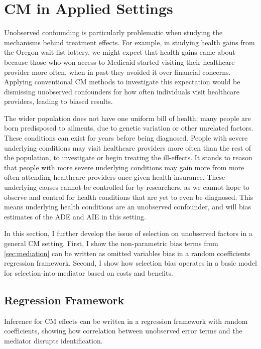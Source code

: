 \section{CM in Applied Settings}
\label{sec:applied}
Unobserved confounding is particularly problematic when studying the mechanisms behind treatment effects.
For example, in studying health gains from the Oregon wait-list lottery, we might expect that health gains came about because those who won access to Medicaid started visiting their healthcare provider more often, when in past they avoided it over financial concerns.
Applying conventional CM methods to investigate this expectation would be dismissing unobserved confounders for how often individuals visit healthcare providers, leading to biased results.

The wider population does not have one uniform bill of health; many people are born predisposed to ailments, due to genetic variation or other unrelated factors.
These conditions can exist for years before being diagnosed.
People with severe underlying conditions may visit healthcare providers more often than the rest of the population, to investigate or begin treating the ill-effects.
It stands to reason that people with more severe underlying conditions may gain more from more often attending healthcare providers once given health insurance.
These underlying causes cannot be controlled for by researchers, as we cannot hope to observe and control for health conditions that are yet to even be diagnosed.
This means underlying health conditions are an unobserved confounder, and will bias estimates of the ADE and AIE in this setting.

In this section, I further develop the issue of selection on unobserved factors in a general CM setting.
First, I show the non-parametric bias terms from \autoref{sec:mediation} can be written as omitted variables bias in a random coefficients regression framework.
Second, I show how selection bias operates in a basic model for selection-into-mediator based on costs and benefits.

\subsection{Regression Framework}
\label{sec:regression}
Inference for CM effects can be written in a regression framework with random coefficients, showing how correlation between unobserved error terms and the mediator disrupts identification.

